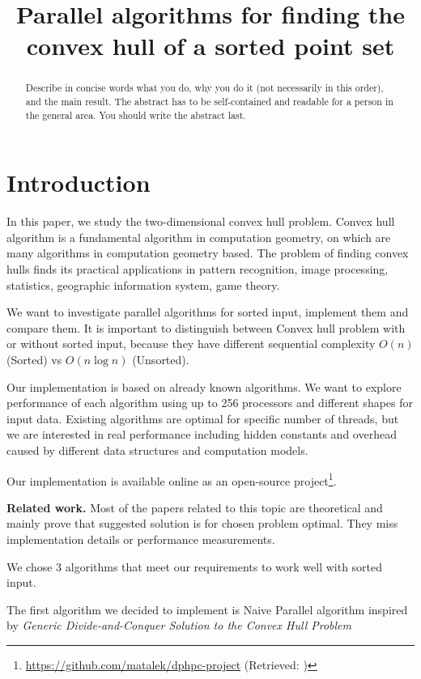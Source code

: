 \documentclass[letterpaper]{article}
\title{Parallel algorithms for finding the convex hull of a sorted point set}
\newcommand{\mypar}[1]{{\bf #1.}}
\theoremstyle{definition}
\begin{document}
%
\maketitle
%

\begin{abstract}
Describe in concise words what you do, why you do it (not necessarily
in this order), and the main result.  The abstract has to be
self-contained and readable for a person in the general area. You
should write the abstract last.
\end{abstract}

\section{Introduction}\label{sec:intro}


In this paper, we study the two-dimensional convex hull problem. Convex hull algorithm is a fundamental algorithm in computation geometry, on which are many algorithms in computation geometry based. The problem of finding convex hulls finds its practical applications in pattern recognition, image processing, statistics, geographic information system, game theory. 

We want to investigate parallel algorithms for sorted input, implement them and compare them. It is important to distinguish between Convex hull problem with or without sorted input, because they have different sequential complexity $O(n)$ (Sorted) vs $O(n\log n)$ (Unsorted). 

Our implementation is based on already known algorithms. We want to explore performance of each algorithm using up to 256 processors and different shapes for input data. Existing algorithms are optimal for specific number of threads, but we are interested in real performance including hidden constants and overhead caused by different data structures and computation models.

Our implementation is available online as an open-source project\footnote{\url{https://github.com/matalek/dphpc-project} (Retrieved: )}.

\mypar{Related work} Most of the papers related to this topic are theoretical and mainly prove that suggested solution is for chosen problem optimal. They miss implementation details or performance measurements.

We chose 3 algorithms that meet our requirements to work well with sorted input.

The first algorithm we decided to implement is Naive Parallel algorithm inspired by \textit{Generic Divide-and-Conquer Solution to the Convex Hull Problem} \cite{NaiveParallel} 
\end{document}
